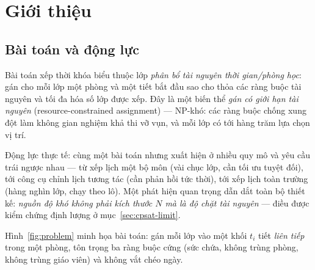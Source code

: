 \section{Giới thiệu}
\label{sec:intro}

\subsection{Bài toán và động lực}
\label{sec:motivation}
Bài toán xếp thời khóa biểu thuộc lớp \emph{phân bổ tài nguyên thời gian/phòng học}:
gán cho mỗi lớp một phòng và một tiết bắt đầu sao cho thỏa các ràng buộc tài nguyên
và tối đa hóa số lớp được xếp. Đây là một biến thể \emph{gán có giới hạn tài nguyên}
(resource-constrained assignment) --- NP-khó: các ràng buộc chống xung đột làm không
gian nghiệm khả thi vỡ vụn, và mỗi lớp có tới hàng trăm lựa chọn vị trí.

Động lực thực tế: cùng một bài toán nhưng xuất hiện ở nhiều quy mô và yêu cầu trái
ngược nhau --- từ xếp lịch một bộ môn (vài chục lớp, cần tối ưu tuyệt đối), tới
công cụ chỉnh lịch tương tác (cần phản hồi tức thời), tới xếp lịch toàn trường
(hàng nghìn lớp, chạy theo lô). Một phát hiện quan trọng dẫn dắt toàn bộ thiết kế:
\emph{nguồn độ khó không phải kích thước $N$ mà là độ chặt tài nguyên} --- điều
được kiểm chứng định lượng ở mục~\ref{sec:cpsat-limit}.

Hình~\ref{fig:problem} minh họa bài toán: gán mỗi lớp vào một khối $t_i$ tiết
\emph{liên tiếp} trong một phòng, tôn trọng ba ràng buộc cứng (sức chứa, không
trùng phòng, không trùng giáo viên) và không vắt chéo ngày.

